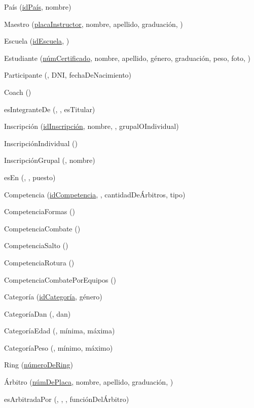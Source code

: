 \par País (\underline{idPaís}, nombre)

\par Maestro (\underline{placaInstructor}, nombre, apellido, graduación, )
\par Escuela (\underline{idEscuela}, )

\par Estudiante (\underline{númCertificado}, nombre, apellido, género, graduación, peso, foto, )
\par Participante (\underline{}, DNI, fechaDeNacimiento)
\par Coach (\underline{})

\par esIntegranteDe (\underline{}, \underline{}, esTitular)
\par Inscripción (\underline{idInscripción}, nombre, , grupalOIndividual)
\par InscripciónIndividual (\underline{})
\par InscripciónGrupal (\underline{}, nombre)

\par esEn (\underline{}, \underline{}, puesto)

\par Competencia (\underline{idCompetencia}, , cantidadDeÁrbitros, tipo)
\par CompetenciaFormas (\underline{})
\par CompetenciaCombate (\underline{})
\par CompetenciaSalto (\underline{})
\par CompetenciaRotura (\underline{})
\par CompetenciaCombatePorEquipos (\underline{})

\par Categoría (\underline{idCategoría}, género)
\par CategoríaDan (\underline{}, dan)
\par CategoríaEdad (\underline{}, mínima, máxima)
\par CategoríaPeso (\underline{}, mínimo, máximo)

\par Ring (\underline{númeroDeRing})
\par Árbitro (\underline{númDePlaca}, nombre, apellido, graduación, )

\par esArbitradaPor (\underline{}, \underline{}, , funciónDelÁrbitro)
